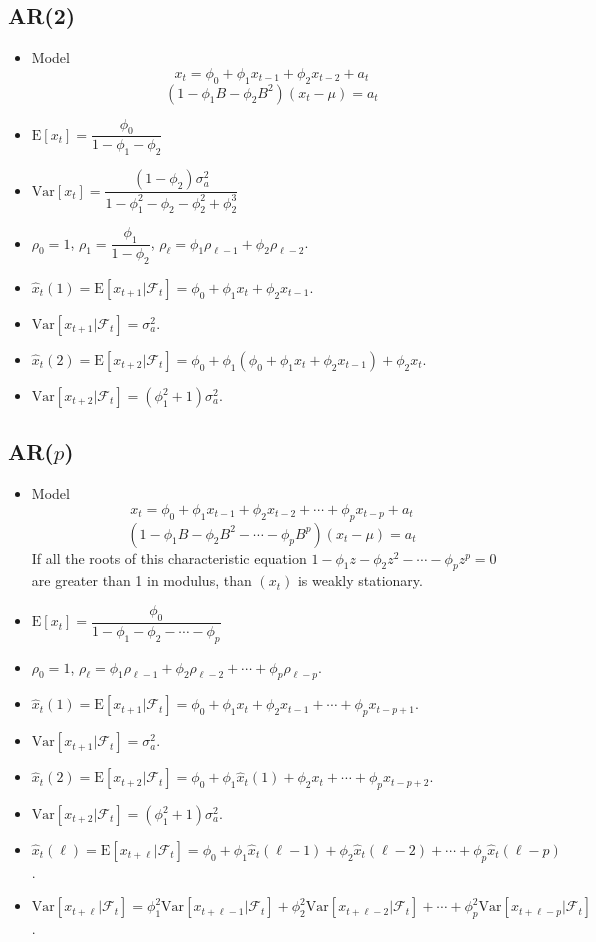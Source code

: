 \documentclass{report}
\theoremstyle{nonumberplain}
\newcommand{\E}{\mathrm{E}}
\newcommand{\Var}{\mathrm{Var}}
\newcommand{\0}{\mathbf{0}}
\begin{document}
\subsection{AR(2)}
\begin{itemize}
	\item Model
	\[
	x_{t}=\phi_0+\phi_1x_{t-1}+\phi_2x_{t-2}+a_t
	\]
	\[
	(1-\phi_1B-\phi_2B^2)(x_{t}-\mu)=a_t
	\]
	\item $\E[x_t]=\dfrac{\phi_0}{1-\phi_1-\phi_2}$
	\item $\Var[x_t]=\dfrac{(1-\phi_2)\sigma_a^2}{1-\phi_1^2-\phi_2-\phi_2^2+\phi_2^3}$
	\item $\rho_0=1$, $\rho_1=\dfrac{\phi_1}{1-\phi_2}$, $\rho_\ell=\phi_1\rho_{\ell-1}+\phi_2\rho_{\ell-2}$.
	\item $\hat{x}_t(1)=\E[x_{t+1}|\mathcal{F}_t]=\phi_0+\phi_1x_{t}+\phi_2x_{t-1}$.
	\item $\Var[x_{t+1}|\mathcal{F}_t]=\sigma_a^2$.
	\item $\hat{x}_t(2)=\E[x_{t+2}|\mathcal{F}_t]=\phi_0+\phi_1(\phi_0+\phi_1x_{t}+\phi_2x_{t-1})+\phi_2x_{t}$.
	\item $\Var[x_{t+2}|\mathcal{F}_t]=(\phi_1^2+1)\sigma_a^2$.
\end{itemize}

\subsection{AR($p$)}
\begin{itemize}
	\item Model
	\[
	x_{t}=\phi_0+\phi_1x_{t-1}+\phi_2x_{t-2}+\cdots+\phi_px_{t-p}+a_t
	\]
	\[
	(1-\phi_1B-\phi_2B^2-\cdots-\phi_pB^p)(x_{t}-\mu)=a_t
	\]
	If all the roots of this characteristic equation $1-\phi_1z-\phi_2z^2-\cdots-\phi_pz^p=0$ are greater than 1 in modulus, than $(x_t)$ is weakly stationary.
	\item $\E[x_t]=\dfrac{\phi_0}{1-\phi_1-\phi_2-\cdots-\phi_p}$
	\item $\rho_0=1$, $\rho_\ell=\phi_1\rho_{\ell-1}+\phi_2\rho_{\ell-2}+\cdots+\phi_p\rho_{\ell-p}$.
	\item $\hat{x}_t(1)=\E[x_{t+1}|\mathcal{F}_t]=\phi_0+\phi_1x_{t}+\phi_2x_{t-1}+\cdots+\phi_px_{t-p+1}$.
	\item $\Var[x_{t+1}|\mathcal{F}_t]=\sigma_a^2$.
	\item $\hat{x}_t(2)=\E[x_{t+2}|\mathcal{F}_t]=\phi_0+\phi_1\hat{x}_t(1)+\phi_2x_{t}+\cdots+\phi_px_{t-p+2}$.
	\item $\Var[x_{t+2}|\mathcal{F}_t]=(\phi_1^2+1)\sigma_a^2$.
	\item $\hat{x}_t(\ell)=\E[x_{t+\ell}|\mathcal{F}_t]=\phi_0+\phi_1\hat{x}_t(\ell-1)+\phi_2\hat{x}_t(\ell-2)+\cdots+\phi_p\hat{x}_t(\ell-p)$.
	\item $\Var[x_{t+\ell}|\mathcal{F}_t]=\phi_1^2\Var[x_{t+\ell-1}|\mathcal{F}_t]+\phi_2^2\Var[x_{t+\ell-2}|\mathcal{F}_t]+\cdots+\phi_p^2\Var[x_{t+\ell-p}|\mathcal{F}_t]$.
\end{itemize}
\end{document}
